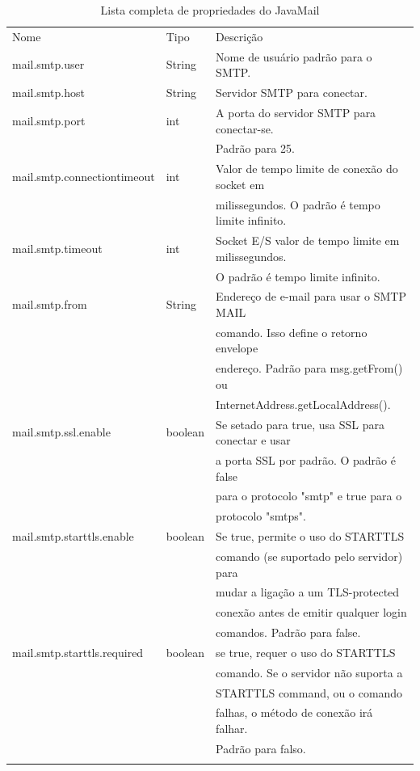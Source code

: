 \documentclass[envcountsame,envcountchap]{svmono}
\begin{document}
\begin{table}
\centering
\caption{Lista completa de propriedades do JavaMail}
\label{tab:javamail-properties}
\begin{tabular}{lll}
\hline\noalign{\smallskip}
Nome & Tipo & Descrição  \\
\noalign{\smallskip}\hline\noalign{\smallskip}
mail.smtp.user & String & Nome de usuário padrão para o SMTP. \\
mail.smtp.host & String & Servidor SMTP para conectar. \\
mail.smtp.port & int & A porta do servidor SMTP para conectar-se.\\ & & Padrão para 25. \\
mail.smtp.connectiontimeout & int & Valor de tempo limite de conexão do socket em \\ & & milissegundos. O padrão é tempo limite infinito.\\
mail.smtp.timeout & int & Socket E/S valor de tempo limite em milissegundos. \\ & & O padrão é tempo limite infinito. \\
mail.smtp.from & String & Endereço de e-mail para usar o SMTP MAIL \\ & & comando. Isso define o retorno envelope \\ & & endereço. Padrão para msg.getFrom() ou \\ & & InternetAddress.getLocalAddress(). \\
mail.smtp.ssl.enable & boolean & Se setado para true, usa SSL para conectar e usar \\ & & a porta SSL por padrão. O padrão é false \\ & & para o protocolo "smtp" e true para o \\ & & protocolo "smtps". \\
mail.smtp.starttls.enable & boolean & Se true, permite o uso do STARTTLS\\ & & comando (se suportado pelo servidor) para\\ & & mudar a ligação a um TLS-protected\\ & & conexão antes de emitir qualquer login\\ & & comandos. Padrão para false. \\
mail.smtp.starttls.required & boolean & se true, requer o uso do STARTTLS \\ & & comando. Se o servidor não suporta a \\ & & STARTTLS command, ou o comando \\ & & falhas, o método de conexão irá falhar. \\ & &Padrão para falso. \\
\noalign{\smallskip}\hline
\end{tabular}
\end{table}

\backmatter

\printindex
\end{document}

